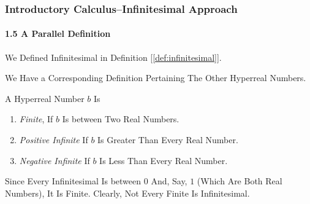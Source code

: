\begin{frame}
\frametitle{Introductory Calculus--Infinitesimal Approach}
\framesubtitle{1.5 A Parallel Definition}
\label{slide:1.5-13}
We Defined \alert{Infinitesimal} in Definition [\ref{def:infinitesimal}].

We Have a Corresponding Definition Pertaining The Other Hyperreal Numbers.
\begin{definition}
A Hyperreal Number $b$ Is
\begin{enumerate}
\item \alert{\textit{Finite}}, If $b$ Is between Two Real Numbers.
\item \alert{\textit{Positive Infinite}} If $b$ Is Greater Than Every Real Number.
\item \alert{\textit{Negative Infinite}} If $b$ Is Less Than Every Real Number.
\end{enumerate}
\label{def:finite-infinite}
\end{definition}
Since Every \alert{Infinitesimal} Is between $0$ And, Say, $1$ (Which Are Both Real Numbers), It Is \alert{Finite}. Clearly, \alert{Not Every Finite Is Infinitesimal}.
\end{frame}
